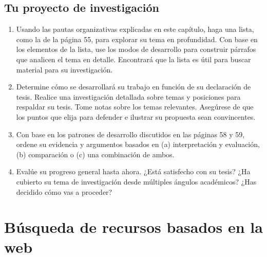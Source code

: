\section{Tu proyecto de investigación}
\begin{enumerate}[1.]
    \item  Usando las pautas organizativas explicadas en este capítulo, haga una lista, como la de la página 55, para explorar su tema en profundidad. Con base en los elementos de la lista, use los modos de desarrollo para construir párrafos que analicen el tema en detalle. Encontrará que la lista es útil para buscar material para su investigación. 
    \item Determine cómo se desarrollará su trabajo en función de su declaración de tesis. Realice una investigación detallada sobre temas y posiciones para respaldar su tesis. Tome notas sobre los temas relevantes. Asegúrese de que los puntos que elija para defender e ilustrar su propuesta sean convincentes. 
    \item Con base en los patrones de desarrollo discutidos en las páginas 58 y 59, ordene su evidencia y argumentos basados en (a) interpretación y evaluación, (b) comparación o (c) una combinación de ambos. 
    \item Evalúe su progreso general hasta ahora. ¿Está satisfecho con su tesis? ¿Ha cubierto su tema de investigación desde múltiples ángulos académicos? ¿Has decidido cómo vas a proceder?
\end{enumerate}

\chapter{Búsqueda de recursos basados en la web}

